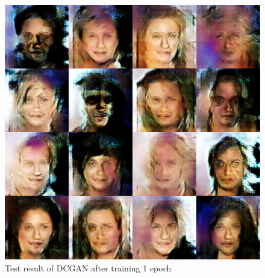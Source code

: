 \begin{figure}
\begin{minipage}[t]{0.48\linewidth}
            \includegraphics[width=\textwidth]{figures/result_dcgan_e1.png}
            \caption{Test result of DCGAN after training 1 epoch}
            \label{dcgan_e1}
        \end{minipage}
    \end{figure}